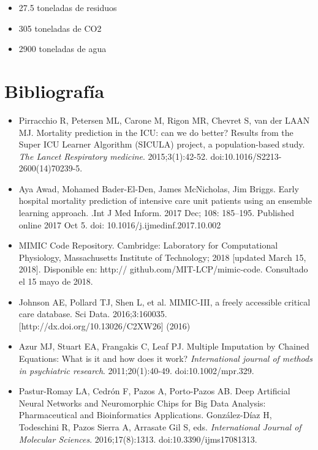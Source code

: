\documentclass{report}
\begin{document}
\begin{itemize}
\item
  27.5 toneladas de residuos
\item
  305 toneladas de CO2
\item
  2900 toneladas de agua
\end{itemize}

\chapter{Bibliografía}
\begin{itemize}

\item
  Pirracchio R, Petersen ML, Carone M, Rigon MR, Chevret S, van der LAAN
  MJ. Mortality prediction in the ICU: can we do better? Results from
  the Super ICU Learner Algorithm (SICULA) project, a population-based
  study. \emph{The Lancet Respiratory medicine}. 2015;3(1):42-52.
  doi:10.1016/S2213-2600(14)70239-5.

\item
  Aya Awad, Mohamed Bader-El-Den, James McNicholas, Jim Briggs. Early
  hospital mortality prediction of intensive care unit patients using an
  ensemble learning approach. .Int J Med Inform. 2017 Dec; 108:
  185--195. Published online 2017 Oct 5. doi:
  10.1016/j.ijmedinf.2017.10.002

\item
  MIMIC Code Repository. Cambridge: Laboratory for Computational
  Physiology, Massachusetts Institute of Technology; 2018 {[}updated
  March 15, 2018{]}. Disponible en: http://
  github.com/MIT-LCP/mimic-code. Consultado el 15 mayo de 2018.

\item
  Johnson AE, Pollard TJ, Shen L, et al. MIMIC-III, a freely accessible
  critical care database. Sci Data. 2016;3:160035.
  {[}http://dx.doi.org/10.13026/C2XW26{]} (2016)

\item
  Azur MJ, Stuart EA, Frangakis C, Leaf PJ. Multiple Imputation by
  Chained Equations: What is it and how does it work?
  \emph{International journal of methods in psychiatric research}.
  2011;20(1):40-49. doi:10.1002/mpr.329.

\item
  Pastur-Romay LA, Cedrón F, Pazos A, Porto-Pazos AB. Deep Artificial
  Neural Networks and Neuromorphic Chips for Big Data Analysis:
  Pharmaceutical and Bioinformatics Applications. González-Díaz H,
  Todeschini R, Pazos Sierra A, Arrasate Gil S, eds. \emph{International
  Journal of Molecular Sciences}. 2016;17(8):1313.
  doi:10.3390/ijms17081313.


\end{itemize}
\end{document}
